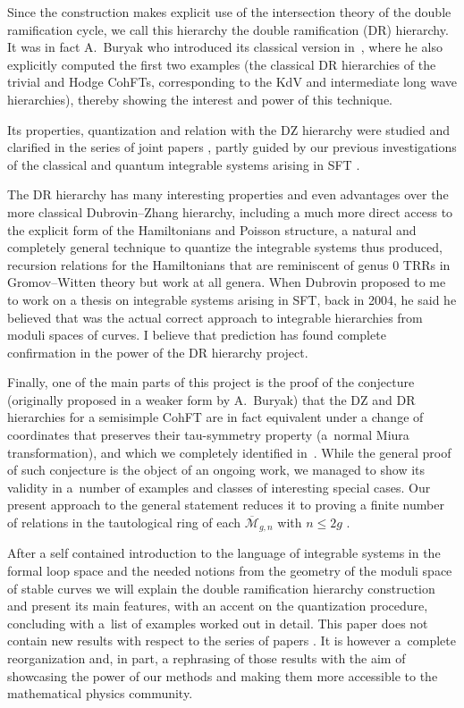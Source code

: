 \documentclass[pdftex]{sigma}
\numberwithin{equation}{section}
\newcommand{\oM}{\overline{\mathcal M}}
\newcommand{\<}{\left<}
\renewcommand{\>}{\right>}
\begin{document}
Since the construction makes explicit use of the intersection theory of the double ramif\/ication cycle, we call this hierarchy the double ramif\/ication (DR) hierarchy. It was in fact A.~Buryak who introduced its classical version in~\cite{Bur15}, where he also explicitly computed the f\/irst two examples (the classical DR hierarchies of the trivial and Hodge CohFTs, corresponding to the KdV and intermediate long wave hierarchies), thereby showing the interest and power of this technique.

Its properties, quantization and relation with the DZ hierarchy were studied and clarif\/ied in the series of joint papers \cite{BDGR16a,BDGR16b,BDGR17,BR15, BR14}, partly guided by our previous investigations of the classical and quantum integrable systems arising in SFT \cite{FR10,Ros08b,Ros08a,Ros10a,Ros10b,Ros12}.

The DR hierarchy has many interesting properties and even advantages over the more classical Dubrovin--Zhang hierarchy, including a much more direct access to the explicit form of the Hamiltonians and Poisson structure, a natural and completely general technique to quantize the integrable systems thus produced, recursion relations for the Hamiltonians that are reminiscent of genus $0$ TRRs in Gromov--Witten theory but work at all genera. When Dubrovin proposed to me to work on a thesis on integrable systems arising in SFT, back in 2004, he said he believed that was the actual correct approach to integrable hierarchies from moduli spaces of curves. I believe that prediction has found complete conf\/irmation in the power of the DR hierarchy project.

Finally, one of the main parts of this project is the proof of the conjecture (originally proposed in a weaker form by A.~Buryak) that the DZ and DR hierarchies for a semisimple CohFT are in fact equivalent under a change of coordinates that preserves their tau-symmetry property (a~normal Miura transformation), and which we completely identif\/ied in~\cite{BDGR16a}. While the general proof of such conjecture is the object of an ongoing work, we managed to show its validity in a~number of examples and classes of interesting special cases. Our present approach to the general statement reduces it to proving a f\/inite number of relations in the tautological ring of each $\oM_{g,n}$ with $n\leq 2g$ \cite{BDGR17}.

After a self contained introduction to the language of integrable systems in the formal loop space and the needed notions from the geometry of the moduli space of stable curves we will explain the double ramif\/ication hierarchy construction and present its main features, with an accent on the quantization procedure, concluding with a~list of examples worked out in detail. This paper does not contain new results with respect to the series of papers \cite{BDGR16a,BDGR16b,BDGR17,BR15, BR14}. It is however a~complete reorganization and, in part, a rephrasing of those results with the aim of showcasing the power of our methods and making them more accessible to the mathematical physics community.
\end{document}
